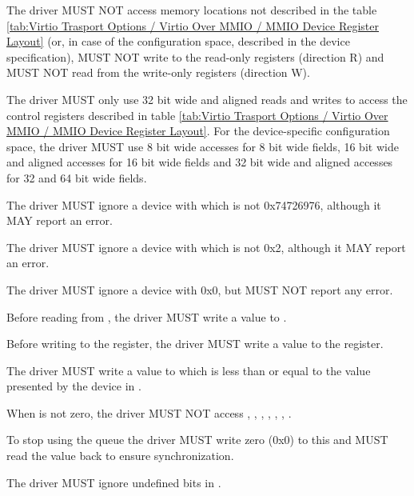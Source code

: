 The driver MUST NOT access memory locations not described in the
table \ref{tab:Virtio Trasport Options / Virtio Over MMIO / MMIO Device Register Layout}
(or, in case of the configuration space, described in the device specification),
MUST NOT write to the read-only registers (direction R) and
MUST NOT read from the write-only registers (direction W).

The driver MUST only use 32 bit wide and aligned reads and writes to access the control registers
described in table \ref{tab:Virtio Trasport Options / Virtio Over MMIO / MMIO Device Register Layout}.
For the device-specific configuration space, the driver MUST use 8 bit wide accesses for
8 bit wide fields, 16 bit wide and aligned accesses for 16 bit wide fields and 32 bit wide and
aligned accesses for 32 and 64 bit wide fields.

The driver MUST ignore a device with  which is not 0x74726976,
although it MAY report an error.

The driver MUST ignore a device with  which is not 0x2,
although it MAY report an error.

The driver MUST ignore a device with  0x0,
but MUST NOT report any error.

Before reading from , the driver MUST write a value to .

Before writing to the  register, the driver MUST write a value to the  register.

The driver MUST write a value to  which is less than
or equal to the value presented by the device in .

When  is not zero, the driver MUST NOT access
, , ,
, , , .

To stop using the queue the driver MUST write zero (0x0) to this
 and MUST read the value back to ensure
synchronization.

The driver MUST ignore undefined bits in .

